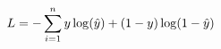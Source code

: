 \documentclass[preview]{standalone}
\begin{document}
\begin{align*}
\special{dvisvgm:raw <g id='unique000'>}L=- \special{dvisvgm:raw </g>}\special{dvisvgm:raw <g id='unique001'>}\sum^n_{i=1}y\log(\hat{y})+(1-y)\log(1-\hat{y})\special{dvisvgm:raw </g>}
\end{align*}
\end{document}

